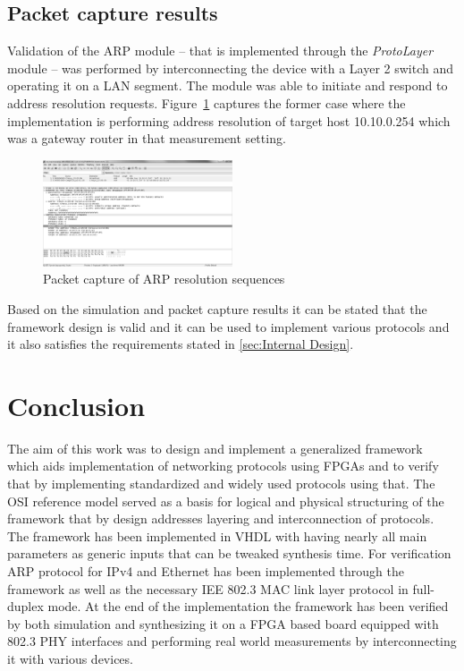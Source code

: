 \documentclass[conference]{IEEEtran}
\begin{document}
\subsection{Packet capture results}

Validation of the ARP module -- that is implemented through the \emph{ProtoLayer} module -- was performed by interconnecting the device with a Layer 2 switch and operating it on a LAN segment. The module was able to initiate and respond to address resolution requests. Figure~\ref{fig:pcap_arp_seq} captures the former case where the implementation is performing address resolution of target host 10.10.0.254 which was a gateway router in that measurement setting.

\begin{figure}[!htb]
    \centering
    \includegraphics[width=0.5\textwidth]{figures_raw/arp_transaction.png}
    \caption{Packet capture of ARP resolution sequences}
    \label{fig:pcap_arp_seq}
\end{figure}

Based on the simulation and packet capture results it can be stated that the framework design is valid and it can be used to implement various protocols and it also satisfies the requirements stated in \ref{sec:Internal Design}.

\section{Conclusion}

The aim of this work was to design and implement a generalized framework which aids implementation of networking protocols using FPGAs and to verify that by implementing standardized and widely used protocols using that. The OSI reference model served as a basis for logical and physical structuring of the framework that by design addresses layering and interconnection of protocols. The framework has been implemented in VHDL with having nearly all main parameters as generic inputs that can be tweaked synthesis time. For verification ARP protocol for IPv4 and Ethernet has been implemented through the framework as well as the necessary IEE 802.3 MAC link layer protocol in full-duplex mode.
At the end of the implementation the framework has been verified by both simulation and synthesizing it on a FPGA based board equipped with 802.3 PHY interfaces and performing real world measurements by interconnecting it with various devices. \cite{Williams_Web_Workload_Characterization_10_Years}
\end{document}
